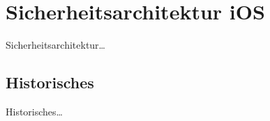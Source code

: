 \section{Sicherheitsarchitektur iOS}
	Sicherheitsarchitektur\ldots
	\subsection{Historisches}
	Historisches\ldots